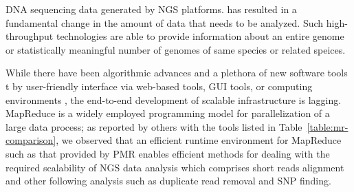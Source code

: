 \documentclass{acm_proc_article-sp}
\begin{document}
DNA sequencing data generated by NGS
platforms\cite{metzker2010,1000genome,wang2009-natrevgen,alex2009,mcpherson2009}.
has resulted in a fundamental change in the amount of data that needs
to be analyzed. Such high-throughput technologies are able to provide
information about an entire genome or statistically meaningful number
of genomes of same species or related speices.


While there have been algorithmic advances and a plethora of new
software tools t by user-friendly interface via web-based tools, GUI
tools, or computing environments \cite{galaxy}, the end-to-end
development of scalable infrastructure is lagging.  MapReduce is a
widely employed programming model for parallelization of a large data
process; as reported by others with the tools listed in
Table~\ref{table:mr-comparison}, we observed that an efficient 
runtime environment for MapReduce such as that provided by PMR 
enables efficient methods for dealing with the required
scalability of NGS data analysis which comprises short reads alignment
and other following analysis such as duplicate read removal and SNP
finding.


\end{document}
